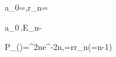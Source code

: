 a_0=,\qquad r_n=

a_0\,,\qquad E_n\simeq-\,

P_\rho(\rho)=\rho^{2n}e^{-2n\rho},\qquad \rho=\frac r{r_n}\quad(\ell=n-1)
